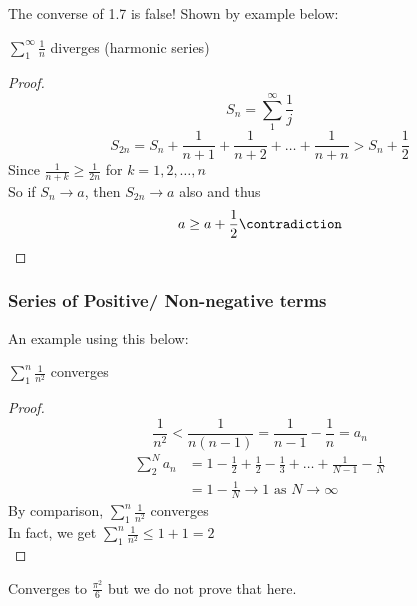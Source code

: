 \begin{remark}
The converse of 1.7 is false! Shown by example below:
\end{remark}
\begin{claim}
$\sum\limits_1^\infty \frac{1}{n}$ diverges (harmonic series)
\begin{proof}
\[S_n = \sum\limits_1^\infty \frac{1}{j}\]
\[S_{2n} = S_n + \frac{1}{n+1} + \frac{1}{n+2} + \dots + \frac{1}{n + n} > S_n + \frac{1}{2}\]
Since $\frac{1}{n+k} \geq \frac{1}{2n}$ for $k = 1,2,\dots,n$\\
So if $S_n \to a$, then $S_{2n} \to a$ also and thus
\[a \geq a + \frac{1}{2} \contradiction\]
\end{proof}
\end{claim}
\subsubsection{Series of Positive/ Non-negative terms}
\begin{normal}
An example using this below:
\end{normal}
\begin{claim}
$\sum\limits_1^n \frac{1}{n^2}$ converges
\begin{proof}
\[\frac{1}{n^2} < \frac{1}{n(n-1)} = \frac{1}{n-1} - \frac{1}{n} = a_n\]
\begin{align*}
    \sum_2^N a_n &= 1 - \frac{1}{2} + \frac{1}{2} - \frac{1}{3} + \dots + \frac{1}{N-1} - \frac{1}{N}\\
    &= 1 - \frac{1}{N} \to 1 \text{ as } N \to \infty
\end{align*}
By comparison, $\sum\limits_1^n \frac{1}{n^2}$ converges\\
In fact, we get $\sum\limits_1^n \frac{1}{n^2} \leq 1 + 1 = 2$\\
\end{proof}
\begin{note}
Converges to $\frac{\pi^2}{6}$ but we do not prove that here.
\end{note}
\end{claim}
